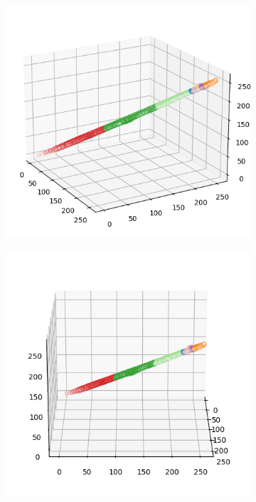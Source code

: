 \begin{figure}[htbp]
\begin{subfigure}[t]{0.32\textwidth}
    \end{subfigure}
    \begin{subfigure}[t]{0.32\textwidth}
        \includegraphics[width=\linewidth]{../../python_code/plots/kmeans/horse-137/clusters_elev20_azim-30.png}
    \end{subfigure}
    \begin{subfigure}[t]{0.32\textwidth}
        \includegraphics[width=\linewidth]{../../python_code/plots/kmeans/horse-137/clusters_elev20_azim0.png}

\end{subfigure}
\end{figure}
